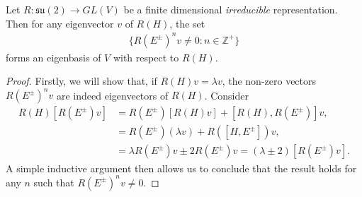 \documentclass[11pt,fleqn]{article}
\renewenvironment{prop}{\begin{pBox}\begin{propT}}{\end{propT}\end{pBox}}
\begin{document}
\begin{prop}
	Let $R : \mathfrak{su}(2) \to GL(V)$ be a finite dimensional \textit{irreducible} representation. Then for any eigenvector $v$ of $R(H)$, the set
		\begin{align*}
			\{ R(E^\pm)^nv \neq 0 : n \in \mathbb{Z}^+ \}
		\end{align*}
	forms an eigenbasis of $V$ with respect to $R(H)$.
\end{prop}
\begin{proof}
	Firstly, we will show that, if $R(H) v = \lambda v$, the non-zero vectors $R(E^\pm)^nv$ are indeed eigenvectors of $R(H)$. Consider
		\begin{align}
			R(H) \left[ R(E^\pm) v \right] 
			&= R(E^\pm) \left[ R(H) v \right] + \left[ R(H), R(E^\pm) \right]v, \nonumber \\
			&= R(E^\pm) ( \lambda v) + R([H,E^\pm]) v, \nonumber \\
			&= \lambda R(E^\pm) v \pm 2 R(E^\pm) v = (\lambda \pm 2) \left[ R(E^\pm) v \right].
		\end{align}
	A simple inductive argument then allows us to conclude that the result holds for any $n$ such that $R(E^\pm)^nv \neq 0$.
	

\end{proof}
\end{document}
